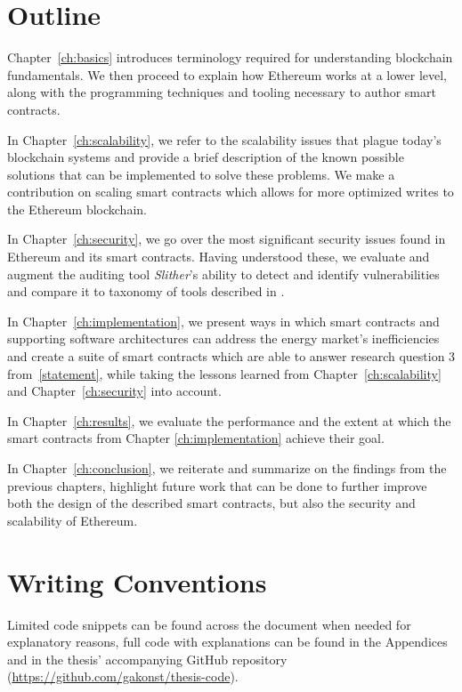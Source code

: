 \section{Outline}

Chapter~\ref{ch:basics} introduces terminology required for understanding blockchain fundamentals. We then proceed to explain how Ethereum works at a lower level, along with the programming techniques and tooling necessary to author smart contracts.

In Chapter~\ref{ch:scalability}, we refer to the scalability issues that plague today's blockchain systems and provide a brief description of the known possible solutions that can be implemented to solve these problems. We make a contribution on scaling smart contracts which allows for more optimized writes to the Ethereum blockchain.

In Chapter~\ref{ch:security}, we go over the most significant security issues found in Ethereum and its smart contracts. Having understood these, we evaluate and augment the auditing tool \textit{Slither}'s ability to detect and identify vulnerabilities and compare it to taxonomy of tools described in \cite{tools}.

In Chapter~\ref{ch:implementation}, we present ways in which smart contracts and supporting software architectures can address the energy market's inefficiencies and create a suite of smart contracts which are able to answer research question 3 from~\ref{statement}, while taking the lessons learned from Chapter~\ref{ch:scalability} and Chapter~\ref{ch:security} into account.

In Chapter~\ref{ch:results}, we evaluate the performance and the extent at which the smart contracts from Chapter \ref{ch:implementation} achieve their goal. 

In Chapter~\ref{ch:conclusion}, we reiterate and summarize on the findings from the previous chapters, highlight future work that can be done to further improve both the design of the described smart contracts, but also the security and scalability of Ethereum.

\section{Writing Conventions}
Limited code snippets can be found across the document when needed for explanatory reasons, full code with explanations can be found in the Appendices and in the thesis' accompanying GitHub repository (\url{https://github.com/gakonst/thesis-code}).
